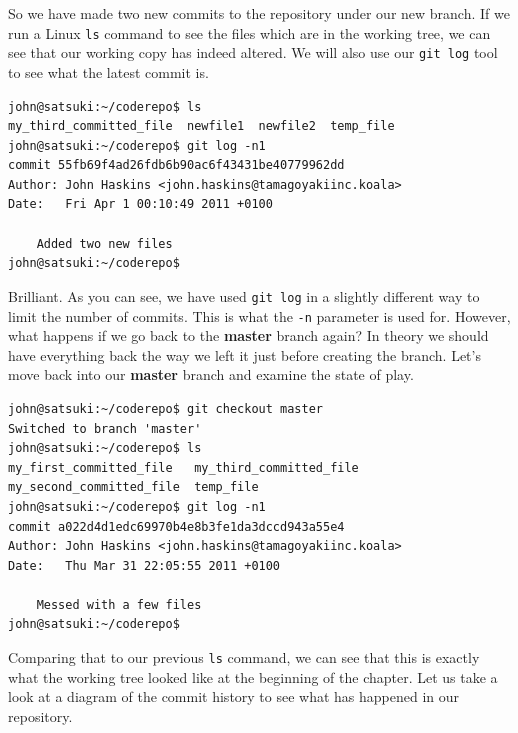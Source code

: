 So we have made two new commits to the repository under our new branch.  If we run a Linux \texttt{ls} command to see the files which are in the working tree, we can see that our working copy has indeed altered.  We will also use our \texttt{git log} tool to see what the latest commit is.

\begin{Verbatim}
john@satsuki:~/coderepo$ ls
my_third_committed_file  newfile1  newfile2  temp_file
john@satsuki:~/coderepo$ git log -n1
commit 55fb69f4ad26fdb6b90ac6f43431be40779962dd
Author: John Haskins <john.haskins@tamagoyakiinc.koala>
Date:   Fri Apr 1 00:10:49 2011 +0100

    Added two new files
john@satsuki:~/coderepo$ 
\end{Verbatim}

Brilliant.  As you can see, we have used \texttt{git log} in a slightly different way to limit the number of commits.  This is what the \texttt{-n} parameter is used for.  However, what happens if we go back to the \textbf{master} branch again?  In theory we should have everything back the way we left it just before creating the branch.  Let's move back into our \textbf{master} branch and examine the state of play.

\begin{Verbatim}
john@satsuki:~/coderepo$ git checkout master
Switched to branch 'master'
john@satsuki:~/coderepo$ ls
my_first_committed_file   my_third_committed_file
my_second_committed_file  temp_file
john@satsuki:~/coderepo$ git log -n1
commit a022d4d1edc69970b4e8b3fe1da3dccd943a55e4
Author: John Haskins <john.haskins@tamagoyakiinc.koala>
Date:   Thu Mar 31 22:05:55 2011 +0100

    Messed with a few files
john@satsuki:~/coderepo$ 
\end{Verbatim}

Comparing that to our previous \texttt{ls} command, we can see that this is exactly what the working tree looked like at the beginning of the chapter.  Let us take a look at a diagram of the commit history to see what has happened in our repository.

